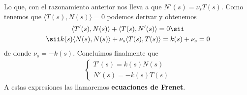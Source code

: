 \begin{propiedades}
\begin{enumerate}
        Lo que, con el razonamiento anterior nos lleva a que $N'(s)=\nu_s T(s)$. Como tenemos que $\langle T(s), N(s) \rangle = 0$ podemos derivar y obtenemos 
        \begin{gather*}
            \langle T'(s), N(s)\rangle + \langle T(s), N'(s)\rangle = 0 \sii\\
            \sii k(s) \langle N(s), N(s) \rangle + \nu_s \langle T(s), T(s) \rangle = k(s) + \nu_s = 0
        \end{gather*}
        de donde $\nu_s = -k(s)$. Concluimos finalmente que 
        \begin{gather*}
            \left\{
                \begin{array}{c}
                    T'(s) = k(s)N(s)\\
                    N'(s) = -k(s)T(s)
                \end{array}
            \right.
        \end{gather*}
        A estas expresiones las llamaremos \textbf{ecuaciones de Frenet}.
    \end{enumerate}
\end{propiedades}

